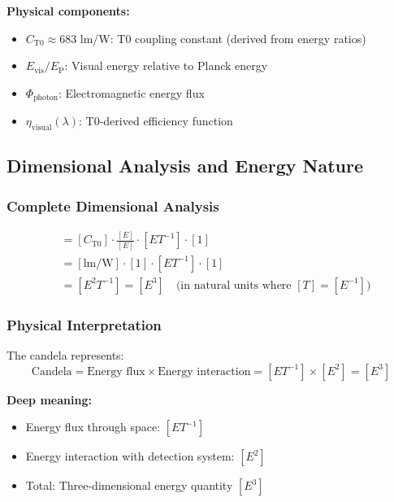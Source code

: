 \documentclass[12pt,a4paper]{article}
\newcommand{\EP}{E_{\text{P}}}
\newcommand{\Evis}{E_{\text{vis}}}
\newcommand{\Cto}{C_{\text{T0}}}
\newcommand{\etavis}{\eta_{\text{visual}}}
\newcommand{\Phiphoton}{\Phi_{\text{photon}}}
\begin{document}
	\textbf{Physical components:}
	\begin{itemize}
		\item $\Cto \approx 683$ lm/W: T0 coupling constant (derived from energy ratios)
		\item $\Evis/\EP$: Visual energy relative to Planck energy
		\item $\Phiphoton$: Electromagnetic energy flux
		\item $\etavis(\lambda)$: T0-derived efficiency function
	\end{itemize}
	
	\subsection{Dimensional Analysis and Energy Nature}
	\label{subsec:candela_dimensional}
	
	\subsubsection{Complete Dimensional Analysis}
	\label{subsubsec:candela_complete_dimensional}
	
	\begin{align}
		[I_{\text{T0}}] &= [\Cto] \cdot \frac{[E]}{[E]} \cdot [E T^{-1}] \cdot [1] \\
		&= [\text{lm/W}] \cdot [1] \cdot [E T^{-1}] \cdot [1] \\
		&= [E^2 T^{-1}] = [E^3] \quad \text{(in natural units where } [T] = [E^{-1}])
		\label{eq:candela_dimensional_analysis}
	\end{align}
	
	\subsubsection{Physical Interpretation}
	\label{subsubsec:candela_physical_interpretation}
	
	The candela represents:
	\begin{equation}
		\text{Candela} = \text{Energy flux} \times \text{Energy interaction} = [E T^{-1}] \times [E^2] = [E^3]
		\label{eq:candela_interpretation}
	\end{equation}
	
	\textbf{Deep meaning:}
	\begin{itemize}
		\item Energy flux through space: $[E T^{-1}]$
		\item Energy interaction with detection system: $[E^2]$
		\item Total: Three-dimensional energy quantity $[E^3]$
	\end{itemize}
	
\end{document}
